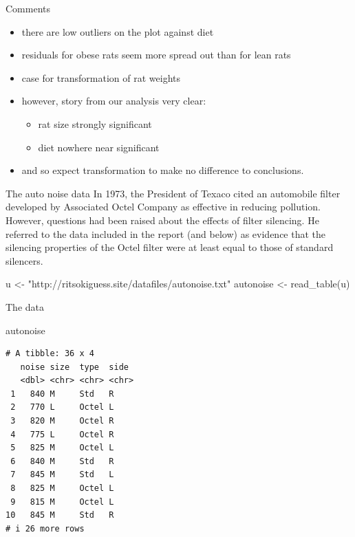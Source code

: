 \documentclass[
  ignorenonframetext,
]{beamer}
\newenvironment{Shaded}{\begin{snugshade}}{\end{snugshade}}
\newcommand{\FunctionTok}[1]{\textcolor[rgb]{0.28,0.35,0.67}{#1}}
\newcommand{\NormalTok}[1]{\textcolor[rgb]{0.00,0.23,0.31}{#1}}
\newcommand{\OtherTok}[1]{\textcolor[rgb]{0.00,0.23,0.31}{#1}}
\newcommand{\StringTok}[1]{\textcolor[rgb]{0.13,0.47,0.30}{#1}}
\providecommand{\tightlist}{%
  \setlength{\itemsep}{0pt}\setlength{\parskip}{0pt}}\usepackage{longtable,booktabs,array}
\begin{document}
\begin{frame}{Comments}
\protect\hypertarget{comments-2}{}
\begin{itemize}
\tightlist
\item
  there are low outliers on the plot against diet
\item
  residuals for obese rats seem more spread out than for lean rats
\item
  case for transformation of rat weights
\item
  however, story from our analysis very clear:

  \begin{itemize}
  \tightlist
  \item
    rat size strongly significant
  \item
    diet nowhere near significant
  \end{itemize}
\item
  and so expect transformation to make no difference to conclusions.
\end{itemize}
\end{frame}

\begin{frame}[fragile]{The auto noise data}
\protect\hypertarget{the-auto-noise-data}{}
In 1973, the President of Texaco cited an automobile filter developed by
Associated Octel Company as effective in reducing pollution. However,
questions had been raised about the effects of filter silencing. He
referred to the data included in the report (and below) as evidence that
the silencing properties of the Octel filter were at least equal to
those of standard silencers.

\begin{Shaded}
\begin{Highlighting}[]
\NormalTok{u }\OtherTok{\textless{}{-}} \StringTok{"http://ritsokiguess.site/datafiles/autonoise.txt"}
\NormalTok{autonoise }\OtherTok{\textless{}{-}} \FunctionTok{read\_table}\NormalTok{(u)}
\end{Highlighting}
\end{Shaded}
\end{frame}

\begin{frame}[fragile]{The data}
\protect\hypertarget{the-data-2}{}
\begin{Shaded}
\begin{Highlighting}[]
\NormalTok{autonoise}
\end{Highlighting}
\end{Shaded}

\begin{verbatim}
# A tibble: 36 x 4
   noise size  type  side 
   <dbl> <chr> <chr> <chr>
 1   840 M     Std   R    
 2   770 L     Octel L    
 3   820 M     Octel R    
 4   775 L     Octel R    
 5   825 M     Octel L    
 6   840 M     Std   R    
 7   845 M     Std   L    
 8   825 M     Octel L    
 9   815 M     Octel L    
10   845 M     Std   R    
# i 26 more rows
\end{verbatim}
\end{frame}
\end{document}
